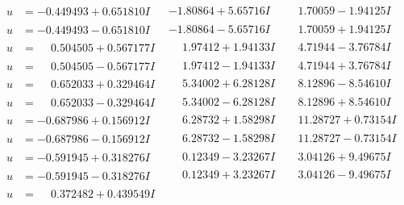\documentclass[1p]{elsarticle_modified}
\theoremstyle{definition}
\begin{document}
$$\begin{array}{c|c|c}
\begin{aligned}
u &= -0.449493 + 0.651810 I\end{aligned}
 & -1.80864 + 5.65716 I & \phantom{-}1.70059 - 1.94125 I \\ \hline\begin{aligned}
u &= -0.449493 - 0.651810 I\end{aligned}
 & -1.80864 - 5.65716 I & \phantom{-}1.70059 + 1.94125 I \\ \hline\begin{aligned}
u &= \phantom{-}0.504505 + 0.567177 I\end{aligned}
 & \phantom{-}1.97412 + 1.94133 I & \phantom{-}4.71944 - 3.76784 I \\ \hline\begin{aligned}
u &= \phantom{-}0.504505 - 0.567177 I\end{aligned}
 & \phantom{-}1.97412 - 1.94133 I & \phantom{-}4.71944 + 3.76784 I \\ \hline\begin{aligned}
u &= \phantom{-}0.652033 + 0.329464 I\end{aligned}
 & \phantom{-}5.34002 + 6.28128 I & \phantom{-}8.12896 - 8.54610 I \\ \hline\begin{aligned}
u &= \phantom{-}0.652033 - 0.329464 I\end{aligned}
 & \phantom{-}5.34002 - 6.28128 I & \phantom{-}8.12896 + 8.54610 I \\ \hline\begin{aligned}
u &= -0.687986 + 0.156912 I\end{aligned}
 & \phantom{-}6.28732 + 1.58298 I & \phantom{-}11.28727 + 0.73154 I \\ \hline\begin{aligned}
u &= -0.687986 - 0.156912 I\end{aligned}
 & \phantom{-}6.28732 - 1.58298 I & \phantom{-}11.28727 - 0.73154 I \\ \hline\begin{aligned}
u &= -0.591945 + 0.318276 I\end{aligned}
 & \phantom{-}0.12349 - 3.23267 I & \phantom{-}3.04126 + 9.49675 I \\ \hline\begin{aligned}
u &= -0.591945 - 0.318276 I\end{aligned}
 & \phantom{-}0.12349 + 3.23267 I & \phantom{-}3.04126 - 9.49675 I \\ \hline\begin{aligned}
u &= \phantom{-}0.372482 + 0.439549 I\end{aligned}

\end{array}$$
\end{document}
